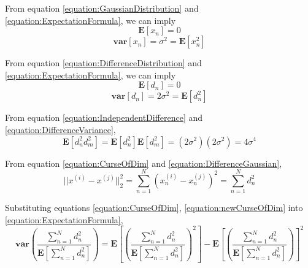 \documentclass[a4paper,12pt]{article}
\begin{document}
From equation \ref{equation:GaussianDistribution} and \ref{equation:ExpectationFormula}, we can imply
\begin{equation}
\mathbf{E}[x_{n}] = 0
\end{equation} 
\begin{equation}
\mathbf{var}[x_{n}] = \sigma^{2} = \mathbf{E}[x_{n}^{2}]
\end{equation} 

From equation \ref{equation:DifferenceDistribution} and \ref{equation:ExpectationFormula}, we can imply
\begin{equation}
\mathbf{E}[d_{n}] = 0
\end{equation} 
\begin{equation}
\label{equation:DifferenceVariance}
\mathbf{var}[d_{n}] = 2\sigma^{2} = \mathbf{E}[d_{n}^{2}]
\end{equation} 

From equation \ref{equation:IndependentDifference} and \ref{equation:DifferenceVariance}, 
\begin{equation}
\mathbf{E}[d_{n}^{2}d_{m}^{2}] = \mathbf{E}[d_{n}^{2}]\mathbf{E}[d_{m}^{2}] = (2\sigma^{2})(2\sigma^{2}) = 4\sigma^{4}
\end{equation} 

From equation \ref{equation:CurseOfDim} and \ref{equation:DifferenceGaussian}, 
\begin{equation}
\label{equation:newCurseOfDim}
||x^{(i)} - x^{(j)}||_{2}^{2} = \sum_{n=1}^{N} (x_{n}^{(i)} - x_{n}^{(j)})^{2} = \sum_{n=1}^{N} d_{n}^{2}
\end{equation} 

Substituting equations \ref{equation:CurseOfDim},  \ref{equation:newCurseOfDim} into \ref{equation:ExpectationFormula}, 
\begin{equation}
\label{equation:ExpandedExpectationFormula}
\mathbf{var}(\frac{\sum_{n=1}^{N} d_{n}^{2}}{\mathbf{E}[\sum_{n=1}^{N} d_{n}^{2}]}) = \mathbf{E}[(\frac{\sum_{n=1}^{N} d_{n}^{2}}{\mathbf{E}[\sum_{n=1}^{N} d_{n}^{2}]})^{2}] - \mathbf{E}[(\frac{\sum_{n=1}^{N} d_{n}^{2}}{\mathbf{E}[\sum_{n=1}^{N} d_{n}^{2}]})]^{2}
\end{equation} 
\end{document}
